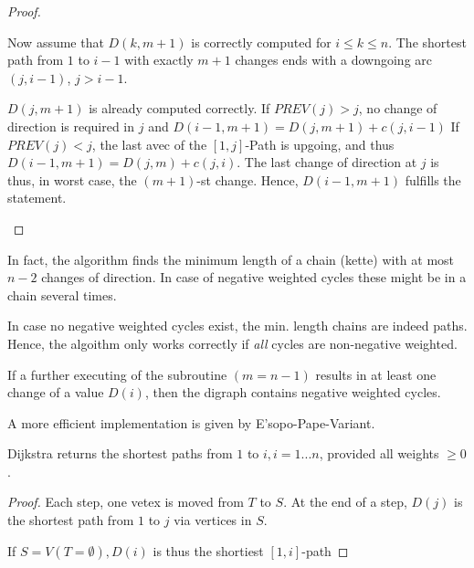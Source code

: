 \begin{proof}
\begin{itemize}
Now assume that $D(k, m+1)$ is correctly computed for $i \leq k \leq n$. The
shortest path from $1$ to $i-1$ with exactly $m+1$ changes ends with a
downgoing arc $(j, i-1)$, $j > i-1$.

$D(j, m+1)$ is already computed correctly. If $PREV(j) > j$, no change of
direction is required in $j$ and $D(i-1, m+1) = D(j, m+1) + c(j,i-1)$
If $PREV(j) < j$, the last avec of the $[1,j]$-Path is upgoing, and thus $D(i-1,m+1)=D(j,m)+c(j,i)$. The last change of direction at $j$ is thus, in worst case, the $(m+1)$-st change. Hence, $D(i-1,m+1)$ fulfills the statement. 
\end{itemize}
\end{proof}

\begin{rem}
In fact, the algorithm finds the minimum length of a chain (kette) with at most $n-2$ changes of direction. In case of negative weighted cycles these might be in a chain several times. 

In case no negative weighted cycles exist, the min. length chains are indeed paths. Hence, the algoithm only works correctly if \emph{all} cycles are non-negative weighted.
\end{rem}

\begin{rem}
If a further executing of the subroutine $(m=n-1)$ results in at least one change of a value $D(i)$, then the digraph contains negative weighted cycles.
\end{rem}

\begin{rem}
A more efficient implementation is given by E'sopo-Pape-Variant.
\end{rem}


\begin{thm}
Dijkstra returns the shortest paths from $1$ to $i, i= 1 ... n$, provided all weights $\geq 0$.
\end{thm}

\begin{proof}
Each step, one vetex is moved from $T$ to $S$. At the end of a step, $D(j)$ is the shortest path from $1$ to $j$ via vertices in $S$. 

If $S=V (T= \emptyset), D(i)$ is thus the shortiest $[1,i]$-path
\end{proof}
